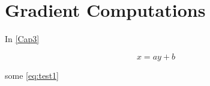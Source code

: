 \chapter{Gradient Computations}
\label{AppendixA}

In \autoref{Cap3}

\begin{equation}
    x = ay + b
    \label{eq:test1}
\end{equation}

some \autoref{eq:test1}